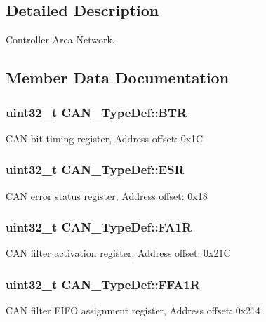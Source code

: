 \subsection{Detailed Description}
Controller Area Network. 

\subsection{Member Data Documentation}
\subsubsection[{\texorpdfstring{B\+TR}{BTR}}]{ uint32\+\_\+t C\+A\+N\+\_\+\+Type\+Def\+::\+B\+TR}\hypertarget{struct_c_a_n___type_def_accad1e4155459a13369f5ad0e7c6da29}{}\label{struct_c_a_n___type_def_accad1e4155459a13369f5ad0e7c6da29}
C\+AN bit timing register, Address offset\+: 0x1C 
\subsubsection[{\texorpdfstring{E\+SR}{ESR}}]{ uint32\+\_\+t C\+A\+N\+\_\+\+Type\+Def\+::\+E\+SR}\hypertarget{struct_c_a_n___type_def_ab1a1b6a7c587443a03d654d3b9a94423}{}\label{struct_c_a_n___type_def_ab1a1b6a7c587443a03d654d3b9a94423}
C\+AN error status register, Address offset\+: 0x18 
\subsubsection[{\texorpdfstring{F\+A1R}{FA1R}}]{ uint32\+\_\+t C\+A\+N\+\_\+\+Type\+Def\+::\+F\+A1R}\hypertarget{struct_c_a_n___type_def_ab57a3a6c337a8c6c7cb39d0cefc2459a}{}\label{struct_c_a_n___type_def_ab57a3a6c337a8c6c7cb39d0cefc2459a}
C\+AN filter activation register, Address offset\+: 0x21C 
\subsubsection[{\texorpdfstring{F\+F\+A1R}{FFA1R}}]{ uint32\+\_\+t C\+A\+N\+\_\+\+Type\+Def\+::\+F\+F\+A1R}\hypertarget{struct_c_a_n___type_def_ae2decd14b26f851e00a31b42d15293ce}{}\label{struct_c_a_n___type_def_ae2decd14b26f851e00a31b42d15293ce}
C\+AN filter F\+I\+FO assignment register, Address offset\+: 0x214 
